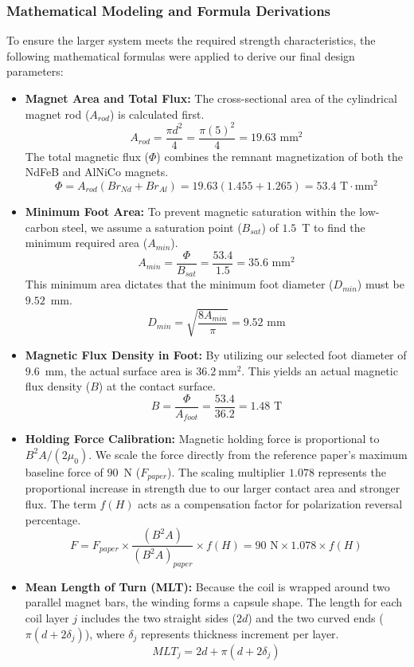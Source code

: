 \documentclass[12pt,a4paper]{article}
\begin{document}
\subsubsection{Mathematical Modeling and Formula Derivations}
To ensure the larger system meets the required strength characteristics, the following mathematical formulas were applied to derive our final design parameters:
\begin{itemize}
    \item \textbf{Magnet Area and Total Flux:} The cross-sectional area of the cylindrical magnet rod ($A_{rod}$) is calculated first. $$A_{rod} = \frac{\pi d^2}{4} = \frac{\pi (5)^2}{4} = 19.63 \text{ mm}^2$$ The total magnetic flux ($\Phi$) combines the remnant magnetization of both the NdFeB and AlNiCo magnets. $$\Phi = A_{rod}(Br_{Nd} + Br_{Al}) = 19.63(1.455 + 1.265) = 53.4 \text{ T}\cdot\text{mm}^2$$
    \item \textbf{Minimum Foot Area:} To prevent magnetic saturation within the low-carbon steel, we assume a saturation point ($B_{sat}$) of $1.5$~T to find the minimum required area ($A_{min}$). $$A_{min} = \frac{\Phi}{B_{sat}} = \frac{53.4}{1.5} = 35.6 \text{ mm}^2$$ This minimum area dictates that the minimum foot diameter ($D_{min}$) must be $9.52$~mm. $$D_{min} = \sqrt{\frac{8A_{min}}{\pi}} = 9.52 \text{ mm}$$
    \item \textbf{Magnetic Flux Density in Foot:} By utilizing our selected foot diameter of $9.6$~mm, the actual surface area is $36.2~\text{mm}^2$. This yields an actual magnetic flux density ($B$) at the contact surface. $$B = \frac{\Phi}{A_{foot}} = \frac{53.4}{36.2} = 1.48 \text{ T}$$
    \item \textbf{Holding Force Calibration:} Magnetic holding force is proportional to $B^2 A / (2\mu_0)$. We scale the force directly from the reference paper's maximum baseline force of $90$~N ($F_{paper}$). The scaling multiplier $1.078$ represents the proportional increase in strength due to our larger contact area and stronger flux. The term $f(H)$ acts as a compensation factor for polarization reversal percentage. $$F = F_{paper} \times \frac{(B^2 A)}{(B^2 A)_{paper}} \times f(H) = 90 \text{ N} \times 1.078 \times f(H)$$
    \item \textbf{Mean Length of Turn (MLT):} Because the coil is wrapped around two parallel magnet bars, the winding forms a capsule shape. The length for each coil layer $j$ includes the two straight sides ($2d$) and the two curved ends ($\pi(d + 2\delta_j)$), where $\delta_j$ represents thickness increment per layer. $$MLT_j = 2d + \pi(d + 2\delta_j)$$

\end{itemize}
\end{document}
